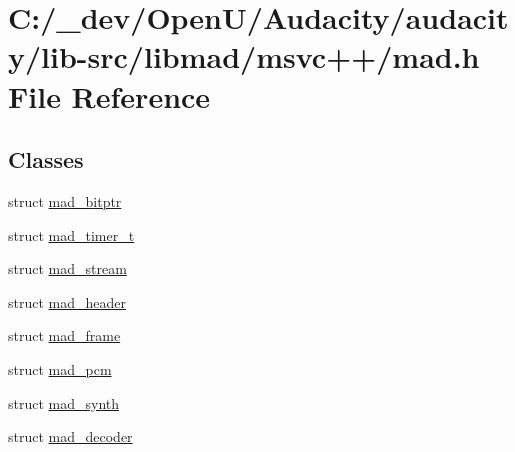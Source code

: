 \hypertarget{lib-src_2libmad_2msvc_09_09_2mad_8h}{}\section{C\+:/\+\_\+dev/\+Open\+U/\+Audacity/audacity/lib-\/src/libmad/msvc++/mad.h File Reference}
\label{lib-src_2libmad_2msvc_09_09_2mad_8h}
\subsection*{Classes}
\begin{DoxyCompactItemize}
\item 
struct \hyperlink{structmad__bitptr}{mad\+\_\+bitptr}
\item 
struct \hyperlink{structmad__timer__t}{mad\+\_\+timer\+\_\+t}
\item 
struct \hyperlink{structmad__stream}{mad\+\_\+stream}
\item 
struct \hyperlink{structmad__header}{mad\+\_\+header}
\item 
struct \hyperlink{structmad__frame}{mad\+\_\+frame}
\item 
struct \hyperlink{structmad__pcm}{mad\+\_\+pcm}
\item 
struct \hyperlink{structmad__synth}{mad\+\_\+synth}
\item 
struct \hyperlink{structmad__decoder}{mad\+\_\+decoder}
\end{DoxyCompactItemize}
